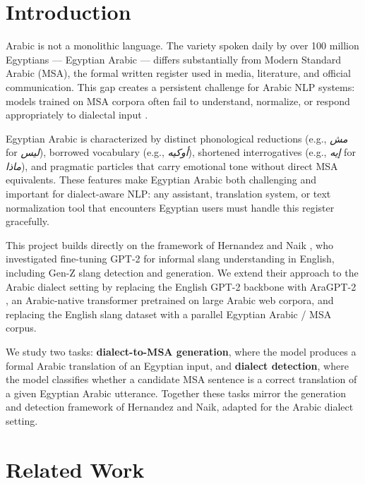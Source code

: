 \documentclass[11pt]{article}
\begin{document}
\section{Introduction}

Arabic is not a monolithic language. The variety spoken daily by over 100 million Egyptians — Egyptian Arabic — differs substantially from Modern Standard Arabic (MSA), the formal written register used in media, literature, and official communication. This gap creates a persistent challenge for Arabic NLP systems: models trained on MSA corpora often fail to understand, normalize, or respond appropriately to dialectal input \cite{habash2010}.

Egyptian Arabic is characterized by distinct phonological reductions (e.g., \textit{مش} for \textit{ليس}), borrowed vocabulary (e.g., \textit{أوكيه}), shortened interrogatives (e.g., \textit{إيه} for \textit{ماذا}), and pragmatic particles that carry emotional tone without direct MSA equivalents. These features make Egyptian Arabic both challenging and important for dialect-aware NLP: any assistant, translation system, or text normalization tool that encounters Egyptian users must handle this register gracefully.

This project builds directly on the framework of Hernandez and Naik \cite{hernandez2025}, who investigated fine-tuning GPT-2 for informal slang understanding in English, including Gen-Z slang detection and generation. We extend their approach to the Arabic dialect setting by replacing the English GPT-2 backbone with AraGPT-2 \cite{antoun2021}, an Arabic-native transformer pretrained on large Arabic web corpora, and replacing the English slang dataset with a parallel Egyptian Arabic / MSA corpus.

We study two tasks: \textbf{dialect-to-MSA generation}, where the model produces a formal Arabic translation of an Egyptian input, and \textbf{dialect detection}, where the model classifies whether a candidate MSA sentence is a correct translation of a given Egyptian Arabic utterance. Together these tasks mirror the generation and detection framework of Hernandez and Naik, adapted for the Arabic dialect setting.

\section{Related Work}
\end{document}
